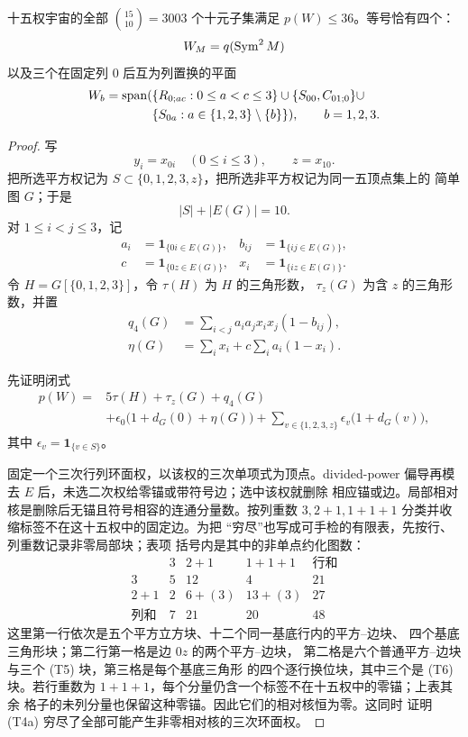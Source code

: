 \begin{proposition}
\label{n5:prop:orbit1terminal}
十五权宇宙的全部 \(\binom{15}{10}=3003\) 个十元子集满足
\(p(W)\le36\)。等号恰有四个：
\[
 W_M=q(\operatorname{Sym}^2M)
\]
以及三个在固定列 \(0\) 后互为列置换的平面
\[
\begin{aligned}
W_b=\operatorname{span}(&\{R_{0;ac}:0\le a<c\le3\}\cup\{S_{00},C_{01;0}\}\cup\\
&\{S_{0a}:a\in\{1,2,3\}\setminus\{b\}\}),\qquad b=1,2,3.
\end{aligned}
\]
\end{proposition}

\begin{proof}
写
\[
y_i=x_{0i}\quad(0\le i\le3),\qquad z=x_{10}.
\]
把所选平方权记为
\(S\subset\{0,1,2,3,z\}\)，把所选非平方权记为同一五顶点集上的
简单图 \(G\)；于是
\[
 |S|+|E(G)|=10.                                      \tag{T1}
\]
对 \(1\le i<j\le3\)，记
\[
\begin{aligned}
a_i&=\mathbf1_{\{0i\in E(G)\}},&
b_{ij}&=\mathbf1_{\{ij\in E(G)\}},\\
c&=\mathbf1_{\{0z\in E(G)\}},&
x_i&=\mathbf1_{\{iz\in E(G)\}}.
\end{aligned}
\]
令 \(H=G[\{0,1,2,3\}]\)，令 \(\tau(H)\) 为 \(H\) 的三角形数，
\(\tau_z(G)\) 为含 \(z\) 的三角形数，并置
\[
\begin{aligned}
q_4(G)&=\sum_{i<j}a_ia_jx_ix_j(1-b_{ij}),\\
\eta(G)&=\sum_i x_i+c\sum_i a_i(1-x_i).
\end{aligned}                                                   \tag{T2}
\]

先证明闭式
\[
\begin{aligned}
p(W)={}&5\tau(H)+\tau_z(G)+q_4(G)\\
&+\epsilon_0\bigl(1+d_G(0)+\eta(G)\bigr)
 +\sum_{v\in\{1,2,3,z\}}\epsilon_v\bigl(1+d_G(v)\bigr),
\end{aligned}                                                   \tag{T3}
\]
其中 \(\epsilon_v=\mathbf1_{\{v\in S\}}\)。

固定一个三次行列环面权，以该权的三次单项式为顶点。divided-power
偏导再模去 \(E\) 后，未选二次权给零锚或带符号边；选中该权就删除
相应锚或边。局部相对核是删除后无锚且符号相容的连通分量数。按列重数
\(3,2+1,1+1+1\) 分类并收缩标签不在这十五权中的固定边。为把
“穷尽”也写成可手检的有限表，先按行、列重数记录非零局部块；表项
括号内是其中的非单点约化图数：
\[
\begin{array}{c|ccc|c}
 &3&2+1&1+1+1&\text{行和}\\ \hline
3&5&12&4&21\\
2+1&2&6+(3)&13+(3)&27\\ \hline
\text{列和}&7&21&20&48
\end{array}                                                     \tag{T4a}
\]
这里第一行依次是五个平方立方块、十二个同一基底行内的平方--边块、
四个基底三角形块；第二行第一格是边 \(0z\) 的两个平方--边块，
第二格是六个普通平方--边块与三个 (T5) 块，第三格是每个基底三角形
的四个逐行换位块，其中三个是 (T6) 块。若行重数为
\(1+1+1\)，每个分量仍含一个标签不在十五权中的零锚；上表其余
格子的未列分量也保留这种零锚。因此它们的相对核恒为零。这同时
证明 (T4a) 穷尽了全部可能产生非零相对核的三次环面权。


\end{proof}
